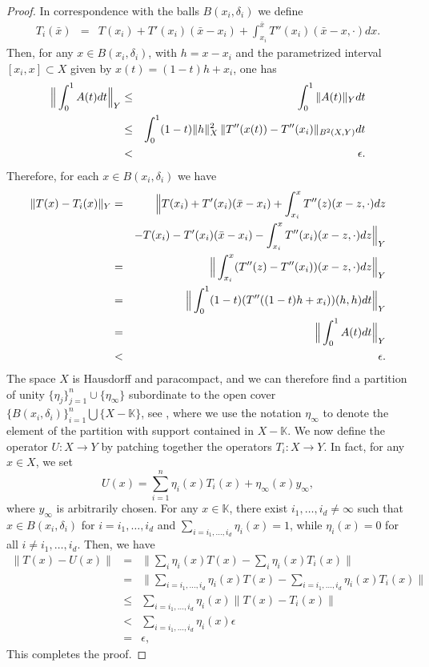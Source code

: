\documentclass[a4paper,12pt,reqno]{amsart}
\theoremstyle{definition}
\theoremstyle{remark}
\begin{document}
\begin{proof}
    In correspondence with the balls $B(x_i,\delta_i)$ we define
    \begin{eqnarray}
            T_i(\bar x) &=& T(x_i) + T'(x_i)(\bar x - x_i) + \int_{x_i}^{\bar x} T''(x_i)(\bar x - x , \cdot)dx. 
    \end{eqnarray}  
    Then, for any $x\in B(x_i,\delta_i)$, with $h = x - x_i$ and the parametrized interval $[x_i,x]\subset X$ given by $x(t) = (1-t)h+x_i$, one has
    \begin{eqnarray*}
        \Big{\|}\int_0^1 A(t)dt\Big{\|}_Y 
        &\leq& \int_0^1 \|A(t){\|}_Ydt\\
        &\leq& \int_0^1(1-t)\|h\|_X^2 \, \|T''(x(t))-T''(x_i){\|}_{B^2(X,Y)}dt\\
        &<& \epsilon. 
    \end{eqnarray*}
    Therefore, for each $x\in B(x_i,\delta_i)$ we have
    \begin{eqnarray*}
        \|T(x) - T_i(x)\|_Y
            &=& \Big{\|}T(x_i) + T'(x_i)(\bar x - x_i) + \int_{x_i}^x T''(z)(x - z, \cdot)dz\\
            && -  T(x_i) -  T'(x_i)(\bar x - x_i) - \int_{x_i}^x T''(x_i)(x - z, \cdot)dz\Big{\|}_Y\\
            &=& \Big{\|}\int_{x_i}^x(T''(z)-T''(x_i))(x-z,\cdot)dz\Big{\|}_Y\\
            &=& \Big{\|}\int_0^1(1-t)(T''((1-t)h+x_i))(h,h)dt\Big{\|}_Y\\
            &=& \Big{\|}\int_0^1 A(t)dt\Big{\|}_Y\\ 
            &<& \epsilon.
    \end{eqnarray*}
    The space $X$ is Hausdorff and paracompact, and we can therefore find a partition of unity $\{\eta_j\}_{j=1}^n\cup \{\eta_\infty\}$ subordinate to the open cover $\{B(x_i,\delta_i)\}_{i=1}^n\bigcup \{X-\mathbb K\}$, see \cite{Dugundji}, where we use the notation $\eta_\infty$ to denote the element of the partition with support contained in $X-\mathbb K$. We now define the operator $U : X \longrightarrow Y$ by patching together the operators $T_i : X \longrightarrow Y$. In fact, for any $x\in X$, we set
    $$
        U(x) = \sum_{i=1}^n \eta_i(x) T_i(x) + \eta_\infty(x)y_\infty,  
    $$
    where $y_\infty$ is arbitrarily chosen. 
    For any $x\in \mathbb K$, there exist $i_1, \ldots, i_d \neq \infty$ such that $x\in B(x_i,\delta_i)$ for $i = i_1, \ldots , i_d$ and $\sum_{i=i_1, \ldots, i_d} \eta_i(x) = 1$, while $\eta_i(x) = 0$ for all $i\neq i_1, \ldots, i_d$. Then, we have
    \begin{eqnarray*}
        \|T(x) - U(x)\| &=& \|\sum_i \eta_i(x)T(x) - \sum_i\eta_i(x)T_i(x)\|\\
                        &=& \|\sum_{i=i_1, \ldots, i_d} \eta_i(x)T(x) - \sum_{i=i_1, \ldots, i_d}\eta_i(x)T_i(x)\|\\
                        &\leq& \sum_{i=i_1, \ldots, i_d} \eta_i(x)\|T(x) - T_i(x)\|\\
                        &<& \sum_{i=i_1, \ldots, i_d} \eta_i(x) \epsilon\\
                        &=& \epsilon, 
    \end{eqnarray*}
    This completes the proof.
\end{proof}
\end{document}
